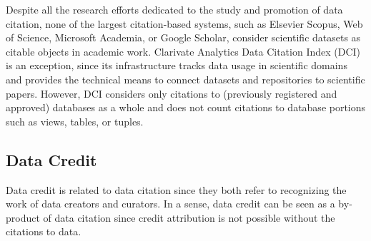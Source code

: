 Despite all the research efforts dedicated to the study and promotion of data citation, none of the largest citation-based systems, such as Elsevier Scopus, Web of Science, Microsoft Academia, or Google Scholar, consider scientific datasets as citable objects in academic work. 
Clarivate Analytics Data Citation Index (DCI) \citep{force2016research} is an exception, since its infrastructure tracks data usage in scientific domains and provides the technical means to connect datasets and repositories to scientific papers. However, DCI considers only citations to (previously registered and approved) databases as a whole and does not count citations to database portions such as views, tables, or tuples.

%



\subsection{Data Credit}
Data credit is related to data citation since they both refer to recognizing the work of data creators and curators. 
In a sense, data credit can be seen as a by-product of data citation since credit attribution is not possible without the citations to data.


